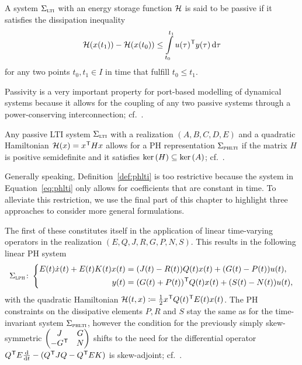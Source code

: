 \begin{definition}\label{def:passivity}
    A system $\Sigma_{\textnormal{\scshape lti}}$ with an energy storage function $\mathcal{H}$ is said to be passive if it satisfies the dissipation inequality
    \begin{equation*}
        \mathcal{H}(x(t_1)) - \mathcal{H}(x(t_0)) \leq \int\limits_{t_0}^{t_1} u(\tau)^{\mkern1mu \mathsf{T}} y(\tau) \mathop{}\!\mathrm{d} \tau
    \end{equation*}
    for any two points $t_0, t_1 \in I$ in time that fulfill $t_0 \leq t_1$.
\end{definition}

\begin{remark}
    Passivity is a very important property for port-based modelling of dynamical systems because it allows for the coupling of any two passive systems through a power-conserving interconnection; cf.~\cite[Section~6.4]{Mehrmann2022}.
\end{remark}

\begin{remark}
    Any passive \ac{LTI} system $\Sigma_{\textnormal{\scshape lti}}$ with a realization $(A, B, C, D, E)$ and a quadratic Hamiltonian $\mathcal{H}(x) = x^{\mkern1mu \mathsf{T}} H x$ allows for a \ac{PH} representation $\Sigma_{\textnormal{\scshape phlti}}$ if the matrix $H$ is positive semidefinite and it satisfies $\mathop{}\!\mathrm{ker}\left(H\right) \subseteq \mathop{}\!\mathrm{ker}\left(A\right)$; cf.~\cite[Theorem~7.1]{VanDerSchaft2014}.
\end{remark}

Generally speaking, Definition~\ref{def:phlti} is too restrictive because the system in Equation~\eqref{eq:phlti} only allows for coefficients that are constant in time.
To alleviate this restriction, we use the final part of this chapter to highlight three approaches to consider more general formulations.

\begin{remark}
    The first of these constitutes itself in the application of linear time-varying operators in the realization $(E, Q, J, R, G, P, N, S)$.
    This results in the following linear \ac{PH} system
    \begin{equation}\label{eq:lph}
        \Sigma_{\textnormal{\scshape lph}} \colon \left\lbrace
        \begin{aligned}
            E(t) \dot{x}(t) + E(t) K(t) x(t) &= (J(t) - R(t)) Q(t) x(t) + (G(t) - P(t)) u(t), \\
            y(t) &= (G(t) + P(t))^{\mkern1mu \mathsf{T}} Q(t) x(t) + (S(t) - N(t)) u(t),
        \end{aligned}
        \right.
    \end{equation}
    with the quadratic Hamiltonian $\mathcal{H}(t, x) \coloneqq \frac{1}{2} x^{\mkern1mu \mathsf{T}} Q(t)^{\mkern1mu \mathsf{T}} E(t) x(t)$.
    The \ac{PH} constraints on the dissipative elements $P, R$ and $S$ stay the same as for the time-invariant system $\Sigma_{\textnormal{\scshape phlti}}$, however the condition for the previously simply skew-symmetric $\begin{pmatrix}
        J & G \\
        -G^{\mkern1mu \mathsf{T}} & N
    \end{pmatrix}$ shifts to the need for the differential operator $Q^{\mkern1mu \mathsf{T}} E \frac{\mathop{}\!\mathrm{d}}{\mathop{}\!\mathrm{d} t} - (Q^{\mkern1mu \mathsf{T}} J Q - Q^{\mkern1mu \mathsf{T}} E K)$ is skew-adjoint; cf.~\cite[Definition~4.8]{Mehrmann2022}.
\end{remark}

